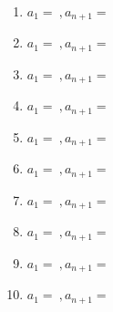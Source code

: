 \documentclass[platex,dvipdfmx]{jlreq}
\begin{document}
\begin{enumerate}[(1)   ]
  \\
  \item $a_1=\ ,a_{n+1}=$
  \\
  \item $a_1=\ ,a_{n+1}=$
  \\
  \item $a_1=\ ,a_{n+1}=$
  \\
  \item $a_1=\ ,a_{n+1}=$
  \\
  \item $a_1=\ ,a_{n+1}=$
  \\
  \item $a_1=\ ,a_{n+1}=$
  \\
  \item $a_1=\ ,a_{n+1}=$
  \\
  \item $a_1=\ ,a_{n+1}=$
  \\
  \item $a_1=\ ,a_{n+1}=$
  \\
  \item $a_1=\ ,a_{n+1}=$
  \\
\end{enumerate}
\end{document}
